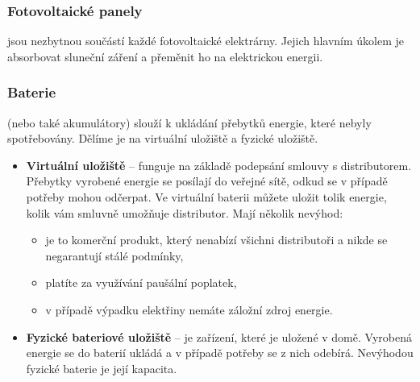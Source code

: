 \subsubsection{Fotovoltaické panely}

jsou nezbytnou součástí každé fotovoltaické elektrárny.
Jejich hlavním úkolem je absorbovat sluneční záření a přeměnit ho na elektrickou energii.

\subsubsection{Baterie}

(nebo také akumulátory) slouží k ukládání přebytků energie, které nebyly spotřebovány.
Dělíme je na virtuální uložiště a fyzické uložiště.

\begin{itemize}
    \item \textbf{Virtuální uložiště} -- funguje na základě podepsání smlouvy s distributorem. Přebytky vyrobené energie se posílají do veřejné sítě, odkud se v případě potřeby mohou odčerpat.  Ve virtuální baterii můžete uložit tolik energie, kolik vám smluvně umožňuje distributor. Mají několik nevýhod:
    \begin{itemize}
        \item je to komerční produkt, který nenabízí všichni distributoři a nikde se negarantují stálé podmínky,
        \item platíte za využívání paušální poplatek,
        \item v případě výpadku elektřiny nemáte záložní zdroj energie.
    \end{itemize}
    \item \textbf{Fyzické bateriové uložiště} -- je zařízení, které je uložené v domě. Vyrobená energie se do baterií ukládá a v případě potřeby se z nich odebírá. Nevýhodou fyzické baterie je její kapacita.
\end{itemize}




